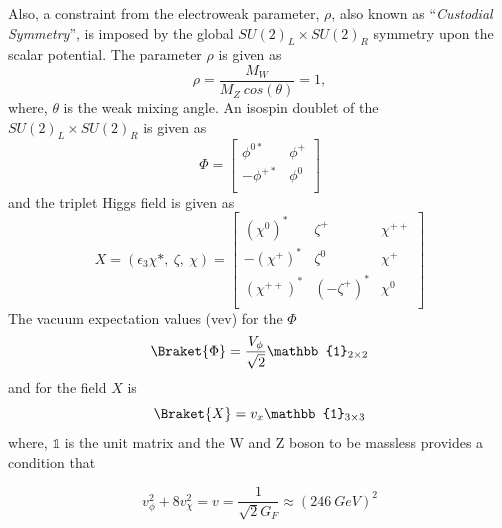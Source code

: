 Also, a constraint from the electroweak parameter, $\rho$, also known as ``\textit{Custodial Symmetry}'', is imposed by the global $SU(2)_L \times SU(2)_R$ symmetry upon the scalar potential. The parameter $\rho$ is given as
\begin{equation}
    \rho = \frac{M_W}{M_Z ~ cos(\theta)} = 1,
\end{equation}
where, $\theta$ is the weak mixing angle.
An isospin doublet of the $SU(2)_L \times SU(2)_R$ is given as
\begin{equation}
    \Phi = 
    \begin{bmatrix}
        \phi^{0*} &  \phi^+ \\
        -\phi^{+*} & \phi^0 \\
    \end{bmatrix}
\end{equation}
and the triplet  Higgs field is given as
\begin{equation}
    X = (\epsilon_3 \chi*,~\zeta,~\chi) = 
    \begin{bmatrix}
        (\chi^0)^*     &   \zeta^+     &   \chi^{++} \\
        -(\chi^{+})^*    &   \zeta^0     &   \chi^+    \\
        (\chi^{++})^*  &   (-\zeta^+)^*   &   \chi^0    \\
    \end{bmatrix}
\end{equation}
The vacuum expectation values (vev) for the $\Phi$
\begin{equation}
    \Braket{\Phi} = \frac{V_\phi}{\sqrt{2}} \mathbb{1}_{2\times 2}
\end{equation}
and for the field $X$ is 
\begin{equation}
    \Braket{X}  = v_x \mathbb{1}_{3\times 3}
\end{equation}
where, $\mathbb{1}$ is the unit matrix and the W and Z boson to be massless provides a condition that

\begin{equation}
    v_\phi^2 + 8v_{\chi}^2 = v = \frac{1}{\sqrt{2}G_F} \approx (246~GeV)^2
\end{equation}

